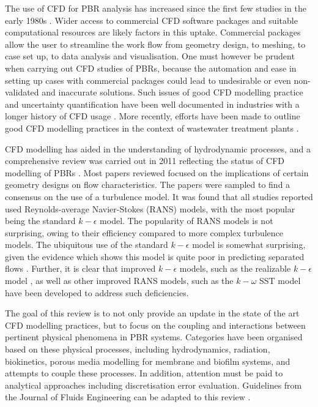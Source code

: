 The use of CFD for PBR analysis has increased since the first few studies in the early 1980s \cite{}. Wider access to commercial CFD software packages and suitable computational resources are likely factors in this uptake. Commercial packages allow the user to streamline the work flow from geometry design, to meshing, to case set up, to data analysis and visualisation. One must however be prudent when carrying out CFD studies of PBRs, because the automation and ease in setting up cases with commercial packages could lead to undesirable or even non-validated and inaccurate solutions. Such issues of good CFD modelling practice and uncertainty quantification have been well documented in industries with a longer history of CFD usage \cite{Roache2002,Oberkampf2002,Celik2008,Pelletier2010}.  More recently, efforts have been made to outline good CFD modelling practices in the context of wastewater treatment plants \cite{Wicklein2016}.

CFD modelling has aided in the understanding of hydrodynamic processes, and a comprehensive review was carried out in 2011 reflecting the status of CFD modelling of PBRs \cite{Bitog2011}. Most papers reviewed focused on the implications of certain geometry designs on flow characteristics. The papers were sampled to find a consensus on the use of a turbulence model. It was found that all studies reported used Reynolds-average Navier-Stokes (RANS) models, with the most popular being the standard $k-\epsilon$ model. The popularity of RANS models is not surprising, owing to their efficiency compared to more complex turbulence models.  The ubiquitous use of the standard $k-\epsilon$ model is somewhat surprising, given the evidence which shows this model is quite poor in predicting separated flows \cite{Menter2003}. Further, it is clear that improved $k-\epsilon$ models, such as the realizable $k-\epsilon$ model \cite{Shih1995}, as well as other improved RANS models, such as the $k-\omega$  SST model \cite{Menter1994,Menter2003} have been developed to address such deficiencies.

The goal of this review is to not only provide an update in the state of the art CFD modelling practices, but to focus on the coupling and interactions between pertinent physical phenomena in PBR systems. Categories have been organised based on these physical processes, including hydrodynamics, radiation, biokinetics, porous media modelling for membrane and biofilm systems, and attempts to couple these processes. In addition, attention must be paid to analytical approaches including discretisation error evaluation. Guidelines from the Journal of Fluids Engineering can be adapted to this review \cite{Celik2008}.

